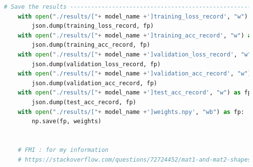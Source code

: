 \documentclass[3p,times,procedia]{elsarticle}
\begin{document}
\begin{lstlisting}[language=Python]
    # Save the results ----------------------------------------------------------------#
    with open("./results/["+ model_name +']training_loss_record', "w") as fp:
        json.dump(training_loss_record, fp)
    with open("./results/["+ model_name +']training_acc_record', "w") as fp:
        json.dump(training_acc_record, fp)
    with open("./results/["+ model_name +']validation_loss_record', "w") as fp:
        json.dump(validation_loss_record, fp)
    with open("./results/["+ model_name +']validation_acc_record', "w") as fp:
        json.dump(validation_acc_record, fp)
    with open("./results/["+ model_name +']test_acc_record', "w") as fp:
        json.dump(test_acc_record, fp)
    with open("./results/["+ model_name +']weights.npy', "wb") as fp:
        np.save(fp, weights)
    
    
    # FMI : for my information
    # https://stackoverflow.com/questions/72724452/mat1-and-mat2-shapes-cannot-be-multiplied-128x4-and-128x64
    
\end{lstlisting}  
\end{document}
